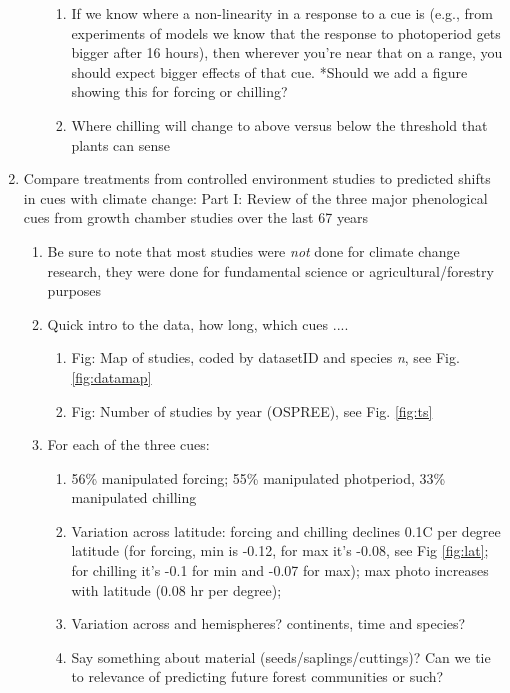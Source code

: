 \documentclass[11pt,letterpaper]{article}
\begin{document}
\begin{enumerate}
\begin{enumerate}
\begin{enumerate}
\item If we know where a non-linearity in a response to a cue is (e.g., from experiments of models we know that the response to photoperiod gets bigger after 16 hours), then wherever you're near that on a range, you should expect bigger effects of that cue. *Should we add a figure showing this for forcing or chilling? %
\item Where chilling will change to above versus below the threshold that plants can sense %
\end{enumerate}
\end{enumerate}
\item Compare treatments from controlled environment studies to predicted shifts in cues with climate change: Part I: Review of the three major phenological cues from growth chamber studies over the last 67 years %
\begin{enumerate}
\item Be sure to note that most studies were \emph{not} done for climate change research, they were done for fundamental science or agricultural/forestry purposes
\item Quick intro to the data, how long, which cues .... 
\begin{enumerate}
\item Fig: Map of studies, coded by datasetID and species \emph{n},  see Fig. \ref{fig:datamap}
\item Fig: Number of studies by year (OSPREE), see Fig. \ref{fig:ts}
\end{enumerate}
\item For each of the three cues:
\begin{enumerate}
\item  56\% manipulated forcing; 55\% manipulated photperiod, 33\% manipulated chilling
\item Variation across latitude: forcing and chilling declines 0.1C per degree latitude (for forcing, min is -0.12, for max it's -0.08, see Fig \ref{fig:lat}; for chilling it's -0.1 for min and -0.07 for max); max photo increases with latitude (0.08 hr per degree); 
\item Variation across and hemispheres? continents, time and species? 
\item Say something about material (seeds/saplings/cuttings)? Can we tie to relevance of predicting future forest communities or such?

\end{enumerate}
\end{enumerate}
\end{enumerate}
\end{document}
